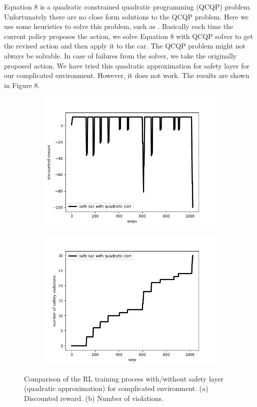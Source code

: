 \documentclass{article} %
\begin{document}
Equation 8 is a quadratic constrained quadratic programming (QCQP) problem. Unfortunately there are no close form solutions to the QCQP problem. Here we use some heuristics to solve this problem, such as \cite{park2017general}. Basically each time the current policy proposes the action, we solve Equation 8 with QCQP solver \cite{park2017general} to get the revised action and then apply it to the car. The QCQP problem might not always be solvable. In case of failures from the solver, we take the originally proposed action. We have tried this quadratic approximation for safety layer for our complicated environment. However, it does not work. The results are shown in Figure 8.

\begin{figure}[ht]
\centering
\begin{subfigure}[b]{0.45\textwidth}
\centering
\includegraphics[width=\textwidth]{fig8a_q_reward.png}
\caption{}
\label{fig:gull}
\end{subfigure}%
\begin{subfigure}[b]{0.34\textwidth}
\centering
\includegraphics[width=\textwidth]{fig8b_q_vio.png}
\caption{}
\label{fig:gull}
\end{subfigure}%
\caption{Comparison of the RL training process with/without safety layer (quadratic approximation) for complicated environment. (a) Discounted reward. (b) Number of violations.}
\end{figure}
\end{document}
